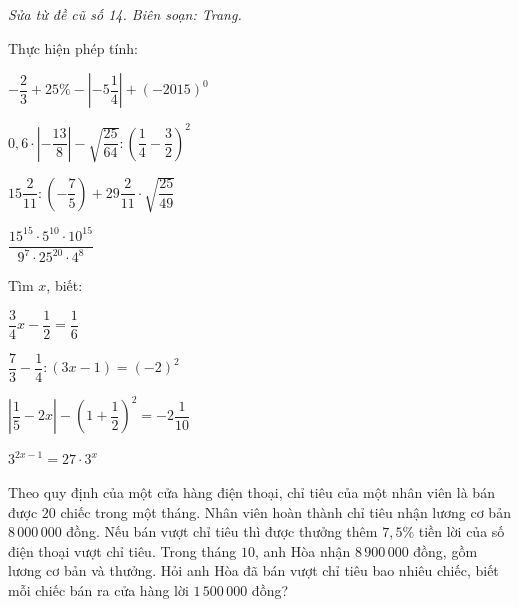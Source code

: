\noindent\textit{Sửa từ đề cũ số 14. Biên soạn: Trang.}

\begin{bt}[2,0 điểm]
Thực hiện phép tính:
\begin{listEX}[1]
\item $-\dfrac{2}{3}+25\%-\left|-5\dfrac{1}{4}\right|+(-2015)^{0}$
\item $0{,}6\cdot\left|-\dfrac{13}{8}\right|-\sqrt{\dfrac{25}{64}}:\left(\dfrac{1}{4}-\dfrac{3}{2}\right)^{2}$
\item $15\dfrac{2}{11}:\left(-\dfrac{7}{5}\right)+29\dfrac{2}{11}\cdot\sqrt{\dfrac{25}{49}}$
\item $\dfrac{15^{15}\cdot 5^{10}\cdot 10^{15}}{9^{7}\cdot 25^{20}\cdot 4^{8}}$
\end{listEX}
\end{bt}

\begin{bt}[2,0 điểm]
Tìm $x$, biết:
\begin{listEX}[2]
\item $\dfrac{3}{4}x-\dfrac{1}{2}=\dfrac{1}{6}$
\item $\dfrac{7}{3}-\dfrac{1}{4}:(3x-1)=(-2)^{2}$
\item $\left|\dfrac{1}{5}-2x\right|-\left(1+\dfrac{1}{2}\right)^{2}=-2\dfrac{1}{10}$
\item $3^{2x-1}=27\cdot 3^{x}$
\end{listEX}
\end{bt}

\begin{bt}[1,0 điểm]
Theo quy định của một cửa hàng điện thoại, chỉ tiêu của một nhân viên là bán được $20$ chiếc trong một tháng. Nhân viên hoàn thành chỉ tiêu nhận lương cơ bản $8\,000\,000$ đồng. Nếu bán vượt chỉ tiêu thì được thưởng thêm $7{,}5\%$ tiền lời của số điện thoại vượt chỉ tiêu. Trong tháng $10$, anh Hòa nhận $8\,900\,000$ đồng, gồm lương cơ bản và thưởng. Hỏi anh Hòa đã bán vượt chỉ tiêu bao nhiêu chiếc, biết mỗi chiếc bán ra cửa hàng lời $1\,500\,000$ đồng?
\end{bt}

